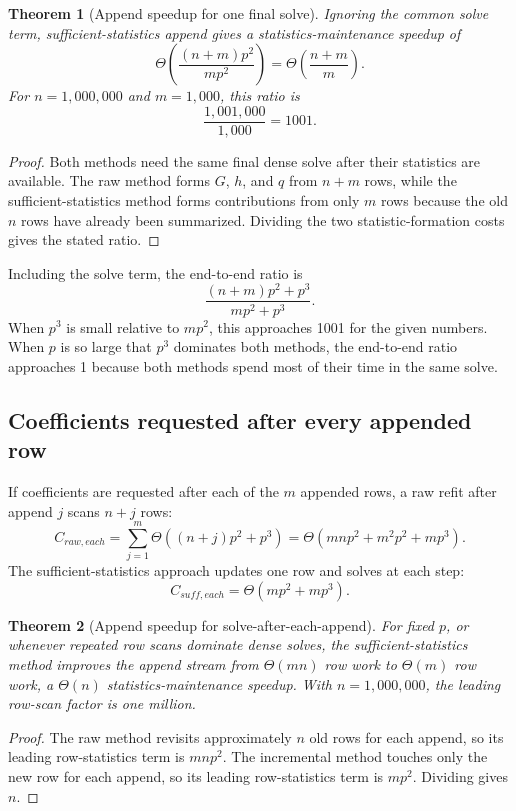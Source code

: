 \documentclass[11pt]{article}
\newtheorem{theorem}{Theorem}
\begin{document}
\begin{theorem}[Append speedup for one final solve]
Ignoring the common solve term, sufficient-statistics append gives a
statistics-maintenance speedup of
\[
  \Theta\left(\frac{(n+m)p^2}{mp^2}\right)
  =
  \Theta\left(\frac{n+m}{m}\right).
\]
For \(n=1{,}000{,}000\) and \(m=1{,}000\), this ratio is
\[
  \frac{1{,}001{,}000}{1{,}000}=1001 .
\]
\end{theorem}

\begin{proof}
Both methods need the same final dense solve after their statistics are
available.  The raw method forms \(G\), \(h\), and \(q\) from \(n+m\)
rows, while the sufficient-statistics method forms contributions from
only \(m\) rows because the old \(n\) rows have already been summarized.
Dividing the two statistic-formation costs gives the stated ratio.
\end{proof}

Including the solve term, the end-to-end ratio is
\[
  \frac{(n+m)p^2+p^3}{mp^2+p^3}.
\]
When \(p^3\) is small relative to \(mp^2\), this approaches 1001 for the
given numbers.  When \(p\) is so large that \(p^3\) dominates both
methods, the end-to-end ratio approaches 1 because both methods spend
most of their time in the same solve.

\subsection{Coefficients requested after every appended row}

If coefficients are requested after each of the \(m\) appended rows, a
raw refit after append \(j\) scans \(n+j\) rows:
\[
  C_{raw,each}
  =
  \sum_{j=1}^{m}\Theta((n+j)p^2+p^3)
  =
  \Theta(mnp^2+m^2p^2+mp^3).
\]
The sufficient-statistics approach updates one row and solves at each
step:
\[
  C_{suff,each}
  =
  \Theta(mp^2+mp^3).
\]

\begin{theorem}[Append speedup for solve-after-each-append]
For fixed \(p\), or whenever repeated row scans dominate dense solves,
the sufficient-statistics method improves the append stream from
\(\Theta(mn)\) row work to \(\Theta(m)\) row work, a
\(\Theta(n)\) statistics-maintenance speedup.  With
\(n=1{,}000{,}000\), the leading row-scan factor is one million.
\end{theorem}

\begin{proof}
The raw method revisits approximately \(n\) old rows for each append,
so its leading row-statistics term is \(mnp^2\).  The incremental
method touches only the new row for each append, so its leading
row-statistics term is \(mp^2\).  Dividing gives \(n\).
\end{proof}
\end{document}
